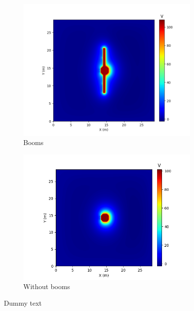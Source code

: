 \begin{center}
\begin{figure}[H]
  \begin{subfigure}[b]{0.61\textwidth}
    \includegraphics[width=\textwidth]{figures/MMO/plusX/Booms/AvgAfter1000BoomsPlusX.png}
    \caption{Booms}
    \label{fig:AvgAfter1000BoomsPlusX}
  \end{subfigure}
  \hfill
  \begin{subfigure}[b]{0.61\textwidth}
    \includegraphics[width=\textwidth]{figures/MMO/plusX/noBooms/AvgAfter1000noBoomsPlusX.png}
    \caption{Without booms}
    \label{fig:AvgAfter1000noBoomsPlusX}
  \end{subfigure}
  \label{fig:AvgPhiDriftX}
  \caption{Dummy text}
\end{figure}
\end{center}



